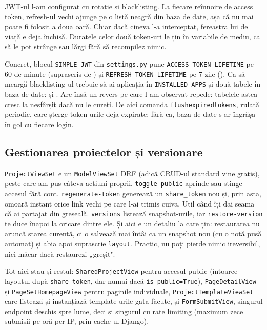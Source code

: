 \documentclass[12pt,a4paper]{report}
\begin{document}
JWT-ul \cite{rfc7519} l-am configurat cu rotație și blacklisting. La fiecare reînnoire
de access token, refresh-ul vechi ajunge pe o listă neagră din baza de date, așa că
nu mai poate fi folosit a doua oară. Chiar dacă cineva l-a interceptat, fereastra
lui de viață e deja închisă. Duratele celor două token-uri le țin în variabile de
mediu, ca să le pot strânge sau lărgi fără să recompilez nimic.

Concret, blocul \texttt{SIMPLE\_JWT} din \texttt{settings.py} pune
\texttt{ACCESS\_TOKEN\_LIFETIME} pe 60 de minute (suprascris de
) și \texttt{REFRESH\_TOKEN\_LIFETIME} pe 7 zile
(). Ca să meargă blacklisting-ul trebuie să ai
aplicația  în \texttt{INSTALLED\_APPS}
și două tabele în baza de date:  și
. Are însă un revers pe care l-am observat
repede: tabelele astea cresc la nesfârșit dacă nu le cureți. De aici comanda
\texttt{flushexpiredtokens}, rulată periodic, care șterge token-urile deja expirate:
fără ea, baza de date s-ar îngrășa în gol cu fiecare login.

\subsection{Gestionarea proiectelor și versionare}

\texttt{ProjectViewSet} e un \texttt{ModelViewSet} DRF (adică CRUD-ul standard vine
gratis), peste care am pus câteva acțiuni proprii. \texttt{toggle-public} aprinde sau
stinge accesul fără cont. \texttt{regenerate-token} generează un \texttt{share\_token}
nou și, prin asta, omoară instant orice link vechi pe care l-ai trimis cuiva. Util
când îți dai seama că ai partajat din greșeală. \texttt{versions} listează
snapshot-urile, iar \texttt{restore-version} te duce înapoi la oricare dintre ele. Și
aici e un detaliu la care țin: restaurarea nu aruncă starea curentă, ci o salvează
mai întâi ca un snapshot nou (cu o notă pusă automat) și abia apoi suprascrie
\texttt{layout}. Practic, nu poți pierde nimic ireversibil, nici măcar dacă restaurezi
„greșit".

Tot aici stau și restul: \texttt{SharedProjectView} pentru accesul public (întoarce
layoutul după \texttt{share\_token}, dar numai dacă \texttt{is\_public=True}),
\texttt{PageDetailView} și \texttt{PageSetHomepageView} pentru paginile individuale,
\texttt{ProjectTemplateViewSet} care listează și instanțiază template-urile gata
făcute, și \texttt{FormSubmitView}, singurul endpoint deschis spre lume, deci și
singurul cu rate limiting (maximum zece submisii pe oră per IP, prin cache-ul Django).
\end{document}
